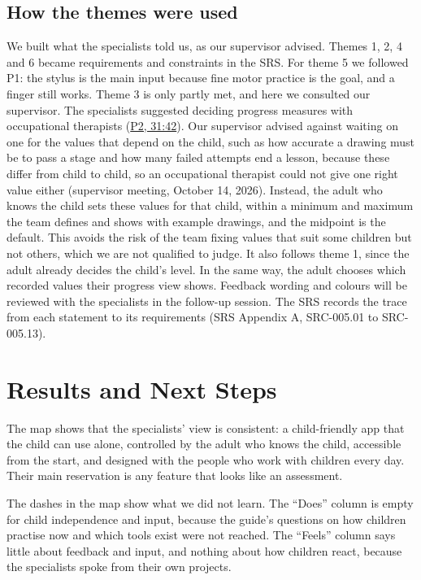 \documentclass{article}
\newcommand{\intlink}[3]{\hyperref[int:#1-#2]{#3}}
\newcommand{\intref}[2]{\intlink{#1}{#2}{#1, #2}}
\begin{document}
\subsection{How the themes were used}

We built what the specialists told us, as our supervisor advised. Themes 1, 2,
4 and 6 became requirements and constraints in the SRS. For theme 5 we
followed P1: the stylus is the main input because fine motor practice is the
goal, and a finger still works. Theme 3 is only partly met, and here we
consulted our supervisor. The specialists suggested deciding progress measures
with occupational therapists (\intref{P2}{31:42}). Our supervisor advised
against waiting on one for the values that depend on the child, such as how
accurate a drawing must be to pass a stage and how many failed attempts end a
lesson, because these differ from child to child, so an occupational therapist
could not give one right value either (supervisor meeting, October 14, 2026).
Instead, the adult who knows the child sets these values for that child, within
a minimum and maximum the team defines and shows with example drawings, and
the midpoint is the default. This avoids the risk of the team fixing values
that suit some children but not others, which we are not qualified to judge.
It also follows theme 1, since the adult already decides the child's level. In
the same way, the adult chooses which recorded values their progress view
shows. Feedback wording and colours will be reviewed with the specialists in
the follow-up session. The SRS records the trace from each
statement to its requirements (SRS Appendix A, SRC-005.01 to SRC-005.13).

\section{Results and Next Steps}
\label{sec:results}

The map shows that the specialists' view is consistent: a child-friendly app
that the child can use alone, controlled by the adult who knows the child,
accessible from the start, and designed with the people who work with
children every day. Their main reservation is any feature that looks like an
assessment.

The dashes in the map show what we did not learn. The ``Does'' column is empty
for child independence and input, because the guide's questions on how
children practise now and which tools exist were not reached. The ``Feels''
column says little about feedback and input, and nothing about how children
react, because the specialists spoke from their own projects.
\end{document}
